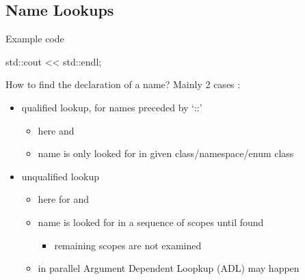 \subsection[ADL]{Name Lookups}

\begin{frame}[fragile]
  \begin{exampleblock}{Example code}
    \begin{cppcode}
      std::cout << std::endl;
    \end{cppcode}
  \end{exampleblock}
  \begin{block}{How to find the declaration of a name?}
    Mainly 2 cases :
    \begin{itemize}
    \item qualified lookup, for names preceded by `::'
      \begin{itemize}
      \item here  and 
      \item name is only looked for in given class/namespace/enum class
      \end{itemize}
    \item unqualified lookup
      \begin{itemize}
      \item here for  and 
      \item name is looked for in a sequence of scopes until found
        \begin{itemize}
        \item remaining scopes are not examined
        \end{itemize}
      \item in parallel Argument Dependent Loopkup (ADL) may happen
      \end{itemize}
    \end{itemize}
  \end{block}
\end{frame}

